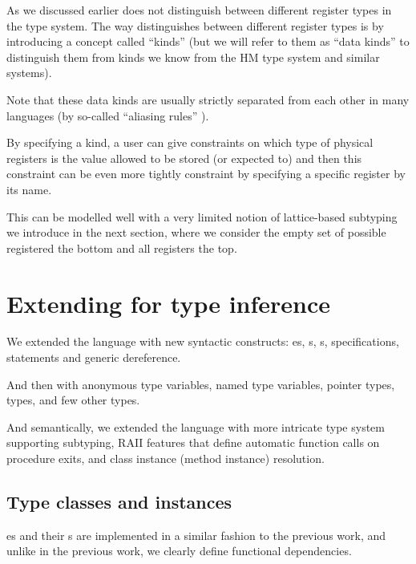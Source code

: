 As we discussed earlier \cmm does not distinguish between different register types in the type system. The way \cmm distinguishes between different register types is by introducing a concept called ``kinds'' (but we will refer to them as ``data kinds'' to distinguish them from kinds we know from the HM type system and similar systems).

Note that these data kinds are usually strictly separated from each other in many languages (by so-called ``aliasing rules'' ).

By specifying a kind, a user can give constraints on which type of physical registers is the value allowed to be stored (or expected to) and then this constraint can be even more tightly constraint by specifying a specific register by its name.

This can be modelled well with a very limited notion of lattice-based subtyping we introduce in the next section, where we consider the empty set of possible registered the bottom and all registers the top.


\section{Extending \cmm for type inference}

We extended the language with new syntactic constructs: es, s, s,  specifications,  statements and \li{[ptr]} generic dereference.

And then with  anonymous type variables,  named type variables,  pointer types,  types, and few other types.

And semantically, we extended the language with more intricate type system supporting subtyping, RAII features that define automatic function calls on procedure exits, and class instance (method instance) resolution.

\subsection{Type classes and instances}

es and their s are implemented in a similar fashion to the previous work, and unlike in the previous work, we clearly define functional dependencies.

